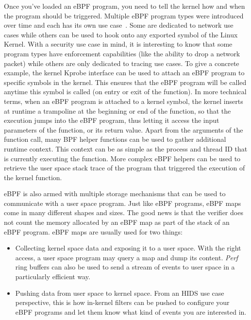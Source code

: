 Once you’ve loaded an eBPF program, you need to tell the kernel how and when the program should be triggered.
Multiple eBPF program types were introduced over time and each has its own use case~\cite{RuntimeSecurityMonitoringWithEBPF:LorenzoDavid}.
Some are dedicated to network use cases while others can be used to hook onto any exported symbol of the Linux Kernel.
With a security use case in mind, it is interesting to know that some program types have enforcement capabilities (like the ability to drop a network packet) while others are only dedicated to tracing use cases.
To give a concrete example, the kernel Kprobe interface can be used to attach an eBPF program to specific symbols in the kernel.
This ensures that the eBPF program will be called anytime this symbol is called (on entry or exit of the function).
In more technical terms, when an eBPF program is attached to a kernel symbol, the kernel inserts at runtime a trampoline at the beginning or end of the function, so that the execution jumps into the eBPF program, thus letting it access the input parameters of the function, or its return value.
Apart from the arguments of the function call, many BPF helper functions can be used to gather additional runtime context.
This context can be as simple as the process and thread ID that is currently executing the function.
More complex eBPF helpers can be used to retrieve the user space stack trace of the program that triggered the execution of the kernel function.

eBPF is also armed with multiple storage mechanisms that can be used to communicate with a user space program.
Just like eBPF programs, eBPF maps come in many different shapes and sizes.
The good news is that the verifier does not count the memory allocated by an eBPF map as part of the stack of an eBPF program.
eBPF maps are usually used for two things:

\begin{itemize}
  \item Collecting kernel space data and exposing it to a user space.
  With the right access, a user space program may query a map and dump its content.
  \emph{Perf} ring buffers can also be used to send a stream of events to user space in a particularly efficient way.
  \item Pushing data from user space to kernel space.
  From an HIDS use case perspective, this is how in-kernel filters can be pushed to configure your eBPF programs and let them know what kind of events you are interested in.
\end{itemize}

